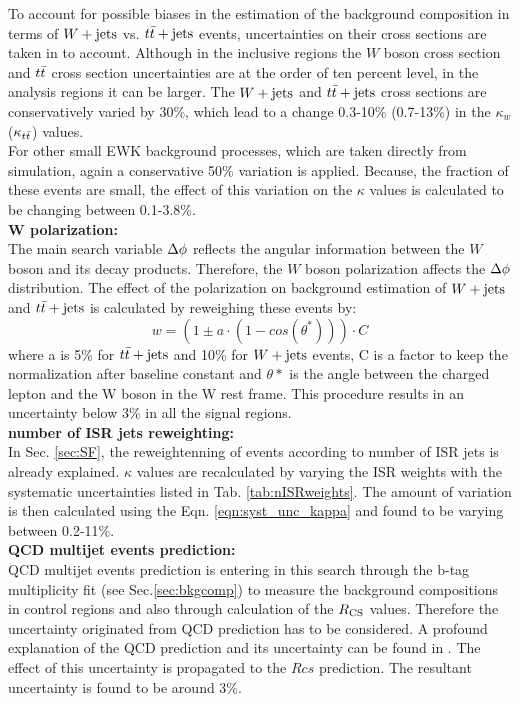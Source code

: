 To account for possible biases in the estimation of the background composition in terms of $W+\textrm{jets}$ vs. $t\bar{t}+\textrm{jets}$ events, uncertainties on their cross sections are taken in to account. Although in the inclusive regions the $W$ boson cross section \cite{Wcross} and $t\bar{t}$ cross section \cite{ttcross} uncertainties are at the order of ten percent level, in the analysis regions it can be larger. The $W+\textrm{jets}$ and $t\bar{t}+\textrm{jets}$ cross sections are conservatively varied by 30\%, which lead to a change 0.3-10\% (0.7-13\%) in the $\kappa_w$ ($\kappa_{t\bar{t}}$) values. \\
For other small EWK background processes, which are taken directly from simulation, again a conservative 50\% variation is applied. Because, the fraction of these events are small, the effect of this variation on the $\kappa$ values is calculated to be changing between 0.1-3.8\%.
\\
\textbf{W polarization:}\\
The main search variable $\Delta \phi$ reflects the angular information between the $W$ boson and its decay products. Therefore, the $W$ boson polarization affects the $\Delta \phi$ distribution. The effect of the polarization on background estimation of $W+\textrm{jets}$ and $t\bar{t}+\textrm{jets}$ is calculated by reweighing these events by:
\begin{equation}
\label{eqn:W_pol}
w = (1 \pm a\cdot(1-cos(\theta^*)))\cdot C
\end{equation}
where a is 5\% for  $t\bar{t}+\textrm{jets}$ and 10\% for $W+\textrm{jets}$ events, C is a factor to keep the normalization after baseline constant and $\theta*$ is the angle between the charged lepton and the W boson in the W rest frame. This procedure results in an uncertainty below 3\% in all the signal regions. \\
\textbf{number of ISR jets reweighting:}\\
In Sec. \ref{sec:SF}, the reweightenning of events according to number of ISR jets is already explained.
$\kappa$ values are recalculated by varying the ISR weights with the systematic uncertainties listed in Tab. \ref{tab:nISRweights}. The amount of variation is then calculated using the Eqn. \ref{eqn:syst_unc_kappa} and found to be varying between 0.2-11\%.\\
\textbf{QCD multijet events prediction:}\\
QCD multijet events prediction is entering in this search through the b-tag multiplicity fit (see Sec.\ref{sec:bkgcomp}) to measure the background compositions in control regions and also through  calculation of the $R_{\rm CS}$ values. Therefore the uncertainty originated from QCD prediction has to be considered. A profound explanation of the QCD prediction and its uncertainty can be found in \cite{David}.  The effect of this uncertainty is propagated to the $Rcs$ prediction. The resultant uncertainty is found to be around 3\%.\\
